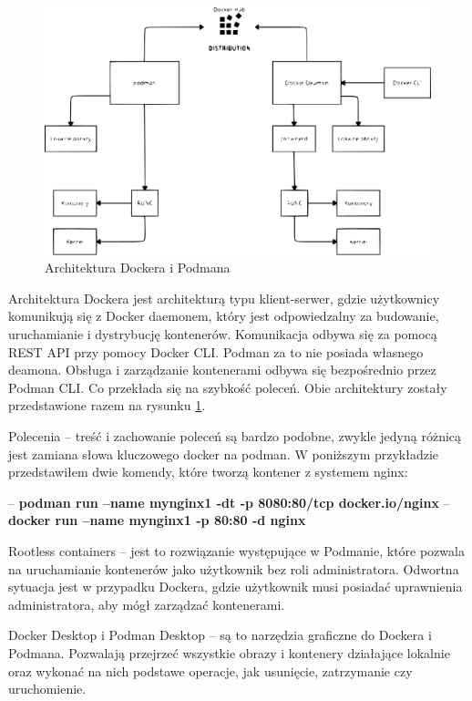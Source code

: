 \documentclass{iiuwb}
\begin{document}
\begin{figure}[!h]
\centering
\includegraphics[width=12cm]{ArchitekturaDockeriPodman.pdf}
\caption{Architektura Dockera i Podmana}
\label{fig: Architektura Dockera i Podmana}
\end{figure}

Architektura Dockera jest architekturą 
typu klient-serwer, gdzie użytkownicy komunikują się z Docker daemonem, 
który jest odpowiedzalny za budowanie, uruchamianie i dystrybucję kontenerów. Komunikacja odbywa się 
za pomocą REST API przy pomocy Docker CLI. Podman za to nie posiada własnego deamona. Obsługa i zarządzanie 
kontenerami odbywa się bezpośrednio przez Podman CLI. Co przekłada się na szybkość poleceń. Obie architektury 
zostały przedstawione razem na rysunku \ref{fig: Architektura Dockera i Podmana}. \newline

Polecenia -- treść i zachowanie poleceń są bardzo podobne, zwykle jedyną różnicą jest zamiana słowa kluczowego docker na podman. W poniższym przykładzie przedstawiłem dwie komendy, które tworzą kontener z systemem nginx: 

\noindent -- \textbf{podman run --name mynginx1 -dt -p 8080:80/tcp docker.io/nginx} \newline
-- \textbf{docker run --name mynginx1 -p 80:80 -d nginx}
\newline

Rootless containers -- jest to rozwiązanie występujące w Podmanie, które pozwala na uruchamianie kontenerów jako użytkownik bez roli administratora. Odwortna sytuacja jest w przypadku Dockera, gdzie użytkownik musi posiadać uprawnienia administratora, aby mógł zarządzać kontenerami.
\newline

Docker Desktop i Podman Desktop -- są to narzędzia graficzne do Dockera i Podmana. Pozwalają przejrzeć wszystkie obrazy i kontenery działające lokalnie oraz wykonać na nich podstawe operacje, jak usunięcie, zatrzymanie czy uruchomienie.
\newline
\end{document}
